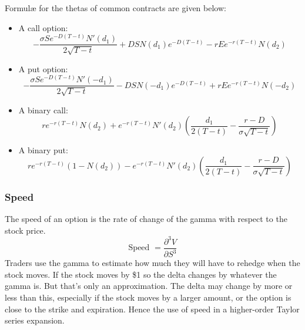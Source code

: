 Formul{\ae} for the thetas of common contracts are given below:
\begin{itemize}
	\setlength\itemsep{0em}
	\item A call option:
	\begin{equation}
		-\frac{\sigma S e^{-D(T-t)} N'(d_1)}{2\sqrt{T-t}} + D S N(d_1) e^{-D(T-t)} - r E e^{-r(T-t)} N(d_2)
	\end{equation}
	\item A put option:
	\begin{equation}
		-\frac{\sigma S e^{-D(T-t)} N'(-d_1)}{2\sqrt{T-t}} - D S N(-d_1) e^{-D(T-t)} + r E e^{-r(T-t)} N(-d_2)
	\end{equation}
	\item A binary call:
	\begin{equation}
		r e^{-r(T-t)} N(d_2) + e^{-r(T-t)} N'(d_2) \left( \frac{d_1}{2(T-t)} - \frac{r-D}{\sigma \sqrt{T-t}} \right)
	\end{equation}
	\item A binary put:
	\begin{equation}
		r e^{-r(T-t)} \left( 1- N(d_2) \right) - e^{-r(T-t)} N'(d_2) \left( \frac{d_1}{2(T-t)} - \frac{r-D}{\sigma \sqrt{T-t}} \right)
	\end{equation}
\end{itemize}


\subsubsection{Speed}
The speed of an option is the rate of change of the gamma with respect to the stock price.
\begin{equation}
    \text{Speed } = \frac{\partial^3 V}{\partial S^3}
\end{equation}
Traders use the gamma to estimate how much they will have to rehedge when the stock moves. If the stock moves by \$1 so the delta changes by whatever the gamma is. But that's only an approximation. The delta may change by more or less than this, especially if the stock moves by a larger amount, or the option is close to the strike and expiration. Hence the use of speed in a higher-order Taylor series expansion.

